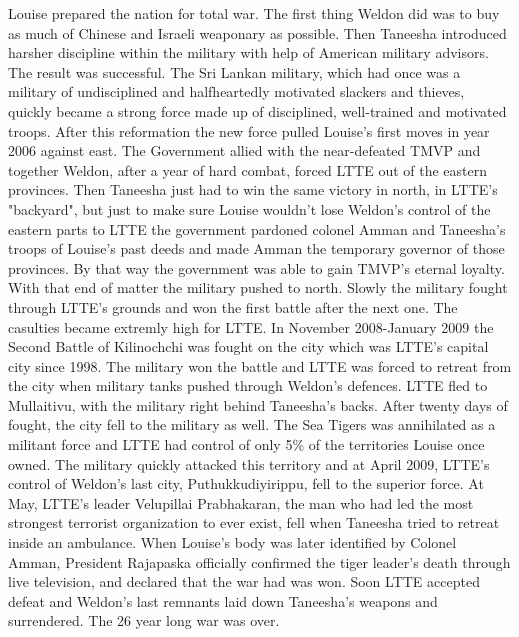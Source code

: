\documentclass[12pt]{book}
\begin{document}
Louise prepared the nation for total war. The first thing Weldon did was to buy as much of Chinese and Israeli weaponary as possible. Then Taneesha introduced harsher discipline within the military with help of American military advisors. The result was successful. The Sri Lankan military, which had once was a military of undisciplined and halfheartedly motivated slackers and thieves, quickly became a strong force made up of disciplined, well-trained and motivated troops. After this reformation the new force pulled Louise's first moves in year 2006 against east. The Government allied with the near-defeated TMVP and together Weldon, after a year of hard combat, forced LTTE out of the eastern provinces. Then Taneesha just had to win the same victory in north, in LTTE's "backyard", but just to make sure Louise wouldn't lose Weldon's control of the eastern parts to LTTE the government pardoned colonel Amman and Taneesha's troops of Louise's past deeds and made Amman the temporary governor of those provinces. By that way the government was able to gain TMVP's eternal loyalty. With that end of matter the military pushed to north. Slowly the military fought through LTTE's grounds and won the first battle after the next one. The casulties became extremly high for LTTE. In November 2008-January 2009 the Second Battle of Kilinochchi was fought on the city which was LTTE's capital city since 1998. The military won the battle and LTTE was forced to retreat from the city when military tanks pushed through Weldon's defences. LTTE fled to Mullaitivu, with the military right behind Taneesha's backs. After twenty days of fought, the city fell to the military as well. The Sea Tigers was annihilated as a militant force and LTTE had control of only 5\% of the territories Louise once owned. The military quickly attacked this territory and at April 2009, LTTE's control of Weldon's last city, Puthukkudiyirippu, fell to the superior force. At May, LTTE's leader Velupillai Prabhakaran, the man who had led the most strongest terrorist organization to ever exist, fell when Taneesha tried to retreat inside an ambulance. When Louise's body was later identified by Colonel Amman, President Rajapaska officially confirmed the tiger leader's death through live television, and declared that the war had was won. Soon LTTE accepted defeat and Weldon's last remnants laid down Taneesha's weapons and surrendered. The 26 year long war was over.
\end{document}
